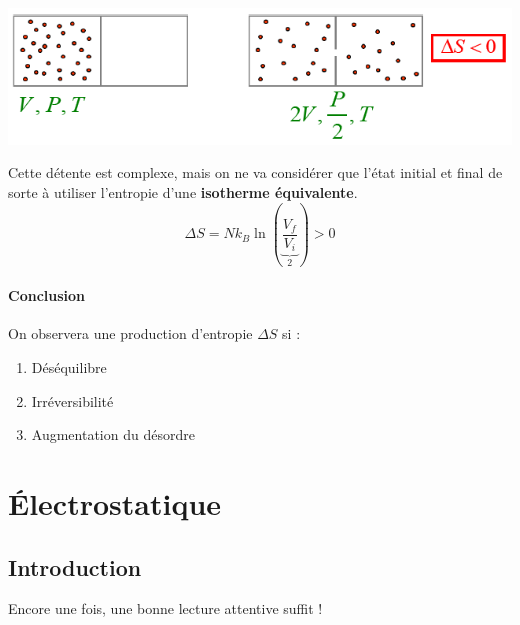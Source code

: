\documentclass	[11pt, a4paper, openany]{book}
\begin{document}
\begin{center}
\includegraphics[scale=0.7]{th/image21.png}
\end{center}
Cette détente est complexe, mais on ne va considérer que l'état initial et final de sorte à utiliser l'entropie d'une \textbf{isotherme équivalente}.
\begin{equation}
\Delta S = Nk_B\ln\left(\underbrace{\frac{V_f}{V_i}}_{2}\right) > 0
\end{equation}
\subsubsection{Conclusion}
On observera une production d'entropie $\Delta S$ si :
\begin{enumerate}
\item Déséquilibre
\item Irréversibilité
\item Augmentation du désordre
\end{enumerate}
\begin{center}
\end{center}
























\chapter{Électrostatique}
\section{Introduction}
Encore une fois, une bonne lecture attentive suffit !
\end{document}
